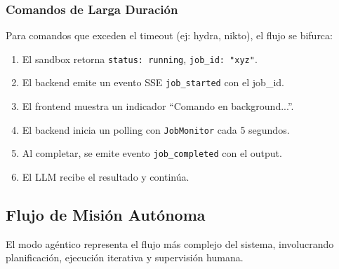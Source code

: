 \subsubsection{Comandos de Larga Duración}

Para comandos que exceden el timeout (ej: hydra, nikto), el flujo se bifurca:

\begin{enumerate}
    \item El sandbox retorna \texttt{status: running}, \texttt{job\_id: "xyz"}.
    \item El backend emite un evento SSE \texttt{job\_started} con el job\_id.
    \item El frontend muestra un indicador ``Comando en background...''.
    \item El backend inicia un polling con \texttt{JobMonitor} cada 5 segundos.
    \item Al completar, se emite evento \texttt{job\_completed} con el output.
    \item El LLM recibe el resultado y continúa.
\end{enumerate}

\subsection{Flujo de Misión Autónoma}

El modo agéntico representa el flujo más complejo del sistema, involucrando planificación, ejecución iterativa y supervisión humana.


